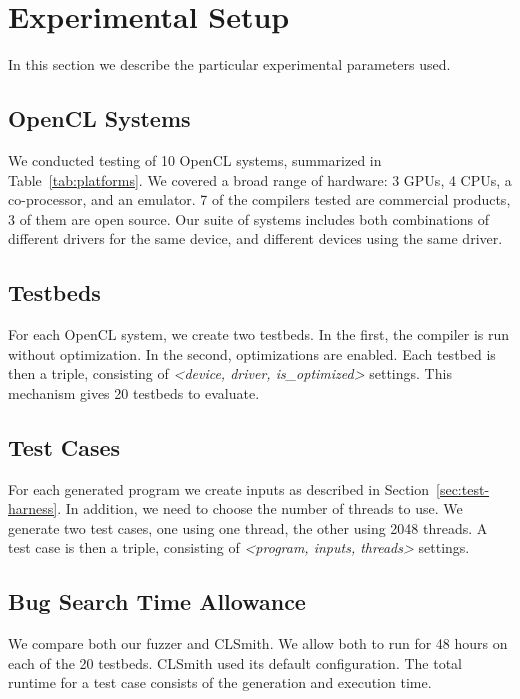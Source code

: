 \section{Experimental Setup}

In this section we describe the particular experimental parameters used.

\subsection{OpenCL Systems}

\begin{table*}[t!]
  \footnotesize %
  \centering %
  
  \caption{%
    OpenCL systems and the number of bug reports submitted to date. For each system, two testbeds are created, one with compiler optimizations, the other without.%
  }
  \label{tab:platforms}
\end{table*}

We conducted testing of 10 OpenCL systems, summarized in Table~\ref{tab:platforms}.  We covered a broad range of hardware: 3 GPUs, 4 CPUs, a co-processor, and an emulator. 7 of the compilers tested are commercial products, 3 of them are open source. Our suite of systems includes both combinations of different drivers for the same device, and different devices using the same driver.

\subsection{Testbeds}
For each OpenCL system, we create two testbeds. In the first, the compiler is run without optimization. In the second, optimizations are enabled. Each testbed is then a triple, consisting of \emph{<device, driver, is\_optimized>} settings. This mechanism gives 20 testbeds to evaluate.

\subsection{Test Cases}
For each generated program we create inputs as described in Section~\ref{sec:test-harness}. In addition, we need to choose the number of threads to use. We generate two test cases, one using one thread, the other using 2048 threads. A test case is then a triple, consisting of \emph{<program, inputs, threads>} settings.

\subsection{Bug Search Time Allowance}
We compare both our fuzzer and CLSmith. We allow both to run for 48 hours on each of the 20 testbeds.  CLSmith used its default configuration. The total runtime for a test case consists of the generation and execution time.
